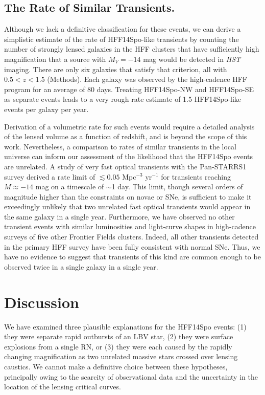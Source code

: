 \documentclass{article}
\providecommand\citet{\cite}
\def\HST{{\it HST}\xspace}
\def\spock{HFF14Spo\xspace}
\def\spockone{HFF14Spo-NW\xspace}
\def\spocktwo{HFF14Spo-SE\xspace}
\begin{document}
\subsection{The Rate of Similar Transients.}\label{sec:Rates}

Although we lack a definitive classification for these events, we can
derive a simplistic estimate of the rate of \spock-like transients by
counting the number of strongly lensed galaxies in the HFF clusters
that have sufficiently high magnification that a source with
$M_{V}=-14$ mag would be detected in \HST imaging. There are only six
galaxies that satisfy that criterion, all with $0.5<z<1.5$
(Methods).  Each galaxy was observed by the high-cadence HFF program
for an average of 80 days.  Treating \spockone and \spocktwo as
separate events leads to a very rough rate estimate of 1.5 \spock-like
events per galaxy per year.

Derivation of a volumetric rate for such events would require a
detailed analysis of the lensed volume as a function of redshift, and
is beyond the scope of this work. Nevertheless, a comparison to rates
of similar transients in the local universe can inform our assessment
of the likelihood that the \spock events are unrelated.  A study of
very fast optical transients with the Pan-STARRS1 survey derived a
rate limit of $\lesssim0.05$ Mpc$^{-3}$ yr$^{-1}$ for transients
reaching $M\approx -14$ mag on a timescale of $\sim$1
day\citet{Berger:2013b}.  This limit, though several orders of
magnitude higher than the constraints on novae or SNe, is sufficient
to make it exceedingly unlikely that two unrelated fast optical
transients would appear in the same galaxy in a single year.
Furthermore, we have observed no other transient events with similar
luminosities and light-curve shapes in high-cadence surveys of five
other Frontier Fields clusters. Indeed, all other transients detected
in the primary HFF survey have been fully consistent with normal SNe.
Thus, we have no evidence to suggest that transients of this kind are
common enough to be observed twice in a single galaxy in a single
year.


\section{Discussion}\label{sec:Discussion}

We have examined three plausible explanations for the \spock events:
(1) they were separate rapid outbursts of an LBV star, (2) they were
surface explosions from a single RN, or (3) they were each caused by
the rapidly changing magnification as two unrelated massive stars
crossed over lensing caustics. We cannot make a definitive choice
between these hypotheses, principally owing to the scarcity of
observational data and the uncertainty in the location of the
lensing critical curves.
\end{document}
